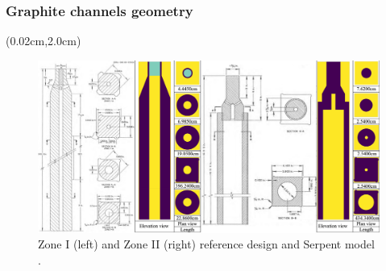 \begin{frame}
\frametitle{Graphite channels geometry}
\begin{textblock*}{12.5cm}(0.02cm,2.0cm) %
\begin{figure}[t]
\includegraphics[width=1.02\textwidth]{./images/detailed_element_xz.png}
\vspace{-5mm}
\caption{Zone I (left) and Zone II (right) reference design 
\cite{robertson_conceptual_1971} and Serpent 
model \cite{rykhlevskii_full-core_2017}.}
\end{figure}
\end{textblock*}

\end{frame}


